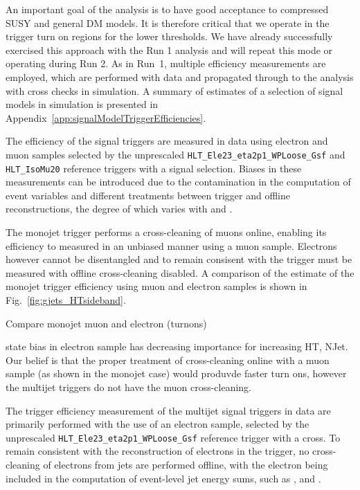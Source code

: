 An important goal of the analysis is to have good acceptance
to compressed SUSY and general DM models. It is therefore critical
that we operate in the trigger turn on regions for the lower
thresholds. We have already successfully exercised this approach with 
the Run 1 analysis and will repeat this mode or operating during Run 2.
As in Run~1, multiple efficiency measurements are
employed, which are performed with data and propagated through to the
analysis with cross checks in simulation. A summary of estimates of a 
selection of signal models in simulation is presented in Appendix~\ref{app:signalModelTriggerEfficiencies}.



% 

The efficiency of the signal triggers are measured in data using electron and muon samples 
selected by the unprescaled \verb!HLT_Ele23_eta2p1_WPLoose_Gsf! and \verb!HLT_IsoMu20! 
reference triggers with a signal selection. Biases in these measurements can be introduced 
due to the contamination in the computation of event variables and different treatments 
between trigger and offline reconstructions, the degree of which varies with \scalht and \njet.

The monojet trigger performs a cross-cleaning of muons online, enabling its efficiency to measured
in an unbiased manner using a muon sample. Electrons however cannot be disentangled and to remain 
consisent with the trigger must be measured with offline cross-cleaning disabled. A comparison of 
the estimate of the monojet trigger efficiency using muon and electron samples is shown in Fig.~\ref{fig:gjets_HTsideband}.


Compare monojet muon and electron (turnons) 


state bias in electron sample has decreasing importance for increasing HT, NJet. 
Our belief is that the proper treatment of cross-cleaning online with a muon sample (as shown in the monojet case) would produvde faster
turn ons, however the multijet triggers do not have the muon cross-cleaning. 




The trigger efficiency measurement of the multijet signal triggers in data are primarily performed with the use of 
an electron sample, selected by the unprescaled \verb!HLT_Ele23_eta2p1_WPLoose_Gsf! reference trigger with a cross. 
To remain consistent with the reconstruction of electrons in the trigger, no cross-cleaning of electrons from jets 
are performed offline, with the electron being included in the computation of event-level jet energy sums, such as 
\scalht, \MHT and \alt. 

